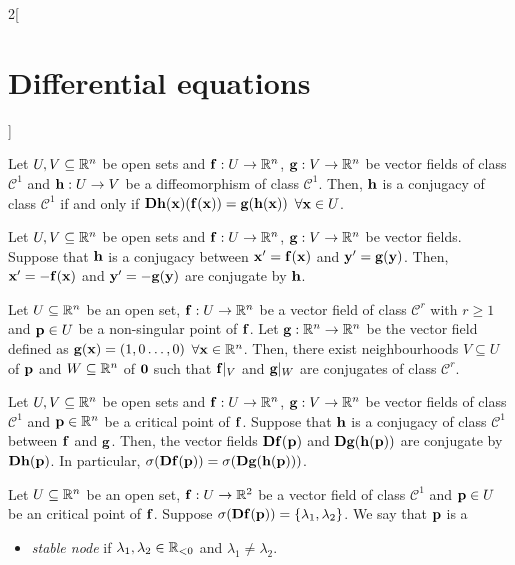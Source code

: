 \documentclass[../../../main.tex]{subfiles}
\begin{document}
\begin{multicols}{2}[\section{Differential equations}]
\begin{definition}
  \end{definition}
  \begin{lemma}
    Let $U,V\subseteq \RR^n$ be open sets and $\vf{f}:U\rightarrow\RR^n$, $\vf{g}:V\rightarrow\RR^n$ be vector fields of class $\mathcal{C}^1$ and $\vf{h}:U\rightarrow V$ be a diffeomorphism of class $\mathcal{C}^1$. Then, $\vf{h}$ is a conjugacy of class $\mathcal{C}^1$ if and only if $\vf{Dh}(\vf{x})(\vf{f}(\vf{x}))=\vf{g}(\vf{h}(\vf{x}))$ $\forall \vf{x}\in U$.
  \end{lemma}
  \begin{prop}
    Let $U,V\subseteq \RR^n$ be open sets and $\vf{f}:U\rightarrow\RR^n$, $\vf{g}:V\rightarrow\RR^n$ be vector fields. Suppose that $\vf{h}$ is a conjugacy between $\vf{x}'=\vf{f}(\vf{x})$ and $\vf{y}'=\vf{g}(\vf{y})$. Then, $\vf{x}'=-\vf{f}(\vf{x})$ and $\vf{y}'=-\vf{g}(\vf{y})$ are conjugate by $\vf{h}$.
  \end{prop}
  \begin{theorem}
    Let $U\subseteq \RR^n$ be an open set, $\vf{f}:U\rightarrow\RR^n$ be a vector field of class $\mathcal{C}^r$ with $r\geq 1$ and $\vf{p}\in U$ be a non-singular point of $\vf{f}$. Let $\vf{g}:\RR^n\rightarrow\RR^n$ be the vector field defined as $\vf{g}(\vf{x})=(1,0\ldots,0)$ $\forall \vf{x}\in\RR^n$. Then, there exist neighbourhoods $V\subseteq U$ of $\vf{p}$ and $W\subseteq \RR^n$ of $\vf{0}$ such that $\vf{f}|_V$ and $\vf{g}|_W$ are conjugates of class $\mathcal{C}^r$.
  \end{theorem}
  \begin{lemma}
    Let $U,V\subseteq \RR^n$ be open sets and $\vf{f}:U\rightarrow\RR^n$, $\vf{g}:V\rightarrow\RR^n$ be vector fields of class $\mathcal{C}^1$ and $\vf{p}\in\RR^n$ be a critical point of $\vf{f}$. Suppose that $\vf{h}$ is a conjugacy of class $\mathcal{C}^1$ between $\vf{f}$ and $\vf{g}$. Then, the vector fields $\vf{Df}(\vf{p})$ and $\vf{Dg}(\vf{h}(\vf{p}))$ are conjugate by $\vf{Dh}(\vf{p})$. In particular, $\sigma(\vf{Df}(\vf{p}))=\sigma(\vf{Dg}(\vf{h}(\vf{p})))$.
  \end{lemma}
  \begin{definition}
    Let $U\subseteq \RR^n$ be an open set, $\vf{f}:U\rightarrow\RR^2$ be a vector field of class $\mathcal{C}^1$ and $\vf{p}\in U$ be an critical point of $\vf{f}$. Suppose $\sigma(\vf{Df}(\vf{p}))=\{\lambda_1,\lambda_2\}$. We say that $\vf{p}$ is a
    \begin{itemize}
      \item \emph{stable node} if $\lambda_1,\lambda_2\in\RR_{<0}$ and $\lambda_1\ne\lambda_2$.

\end{itemize}
\end{definition}
\end{multicols}
\end{document}
